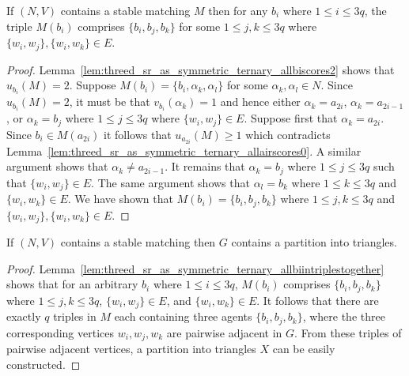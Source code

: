 \begin{lem}
\label{lem:threed_sr_as_symmetric_ternary_allbiintriplestogether}
If $(N, V)$ contains a stable matching $M$ then for any $b_i$ where $1 \leq i \leq 3q$, the triple $M(b_i)$ comprises $\{ b_i, b_j, b_k \}$ for some $1 \leq j, k \leq 3q$ where $\{ w_i, w_j \}, \{ w_i, w_k \} \in E$.
\end{lem}
\begin{proof}
Lemma~\ref{lem:threed_sr_as_symmetric_ternary_allbiscores2} shows that $u_{b_i}(M)=2$. Suppose $M(b_i)=\{ b_i, \alpha_k, \alpha_l \}$ for some $\alpha_k, \alpha_l \in N$. Since $u_{b_i}(M)=2$, it must be that $v_{b_i}(\alpha_k)=1$ and hence either $\alpha_k = a_{2i}$, $\alpha_k = a_{2i-1}$, or $\alpha_k = b_j$ where $1\leq j \leq 3q$ where $\{w_i, w_j\}\in E$. Suppose first that $\alpha_k = a_{2i}$. Since $b_i \in M(a_{2i})$ it follows that $u_{a_{2i}}(M) \geq 1$ which contradicts Lemma~\ref{lem:threed_sr_as_symmetric_ternary_allairscores0}. A similar argument shows that $\alpha_k \neq a_{2i-1}$. It remains that $\alpha_k = b_j$ where $1\leq j \leq 3q$ such that $\{ w_i, w_j \} \in E$. The same argument shows that $\alpha_l = b_k$ where $1\leq k \leq 3q$ and $\{ w_i, w_k \} \in E$. We have shown that $M(b_i) = \{ b_i, b_j, b_k \}$ where $1 \leq j,k \leq 3q$ and $\{w_i, w_j\}, \{w_i, w_k\} \in E$.
\end{proof}

\begin{lem}
\label{lem:threed_sr_as_symmetric_ternary_reduction_seconddirection}
If $(N, V)$ contains a stable matching then $G$ contains a partition into triangles.
\end{lem}
\begin{proof}
Lemma~\ref{lem:threed_sr_as_symmetric_ternary_allbiintriplestogether} shows that for an arbitrary $b_i$ where $1 \leq i \leq 3q$, $M(b_i)$ comprises $\{ b_i, b_j, b_k \}$ where $1 \leq j,k \leq 3q$, $\{w_i, w_j\}\in E$, and $\{w_i, w_k\}\in E$. It follows that there are exactly $q$ triples in $M$ each containing three agents $\{b_i, b_j, b_k\}$, where the three corresponding vertices $w_i, w_j, w_k$ are pairwise adjacent in $G$. From these triples of pairwise adjacent vertices, a partition into triangles $X$ can be easily constructed.
\end{proof}


